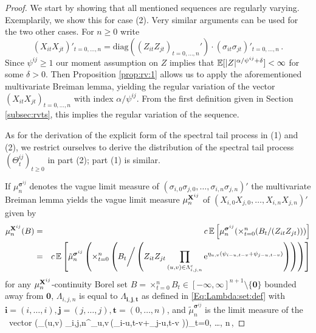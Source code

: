\ere
\begin{proof} 
We start by showing that all mentioned sequences 
are regularly varying. Exemplarily, we show this for case (2). 
Very similar arguments can be used for the two other cases.
For $n \geq 0$ write 
$$ \left(X_{it}X_{jt}\right)'_{t=0, \ldots, n}=\mbox{diag}\left((Z_{it}Z_{jt})_{t=0, \ldots, n}'\right)\cdot
\left(\sigma_{it}\sigma_{jt}\right)'_{t=0, \ldots, n}\,.$$
Since $\psi^{ij} \geq 1$ our moment assumption on $Z$ implies that 
${\mathbb E}[|Z|^{\alpha/\psi^{ij}+\delta}]<\infty$ for some $\delta>0$. Then  Proposition \ref{prop:rv:1} 
allows us to apply the aforementioned multivariate Breiman lemma, yielding  the  
regular variation of the vector $(X_{it}X_{jt})_{t=0, \ldots, n}$ with index $\alpha/\psi^{ij}$. From the first definition given in Section \ref{subsec:rvts}, this implies the regular variation of the sequence.
\par
As for the derivation of the explicit form of the spectral tail process in (1) and (2), we restrict ourselves to derive the distribution of the spectral tail process $(\Theta_t^{ij})_{t \geq 0}$ in part (2); part (1) is similar.
\par
If $\mu_n^{{\boldsymbol{\sigma}}^{ij}}$ denotes the vague limit measure of 
$(\sigma_{i,0}\sigma_{j,0}, \ldots, \sigma_{i,n}\sigma_{j,n})'$ the multivariate Breiman lemma yields 
the vague limit measure $\mu_n^{{\bf X}^{ij}}$ of $(X_{i,0}X_{j,0}, \ldots, X_{i,n}X_{j,n})'$ given by
\begin{eqnarray}\nonumber \mu_n^{{\bf X}^{ij}}(B)&=& c\,{\mathbb E}\left[\mu_n^{\boldsymbol{\sigma}^{ij}}(\times_{t=0}^n (B_t/(Z_{it}Z_{jt})))\right] \\
&=& \label{Eq:mu:X} c\,{\mathbb E}\left[\tilde{\mu}_n^{\boldsymbol{\sigma}^{ij}}\left(\times_{t=0}^n \left(B_t \bigg/ \left(Z_{it}Z_{jt}\prod_{(u,v) \in \Lambda_{i,j,n}^c}{\rm e}^{\eta_{u,v}(\psi_{i-u,t-v}+\psi_{j-u,t-v})}\right)\right)\right)\right] 
\end{eqnarray}
for any $\mu_n^{{\bf X}^{ij}}$-continuity  Borel set $B=\times_{t=0}^n B_t \in [-\infty,\infty]^{n+1} \setminus \{\mathbf{0}\}$ bounded away from $\mathbf{0}$, $\Lambda_{i,j,n}$ is equal to $\Lambda_{\mathbf{i}, \mathbf{j}, \mathbf{t}}$ 
as defined in \eqref{Eq:Lambda:set:def} with $\mathbf{i}=(i, \ldots, i), \mathbf{j}=(j, \ldots, j), \mathbf{t}=(0, \ldots ,n)$, and $\tilde{\mu}^{\boldsymbol{\sigma}^{ij}}_n$ 
is the limit measure of the \regvary\ vector
\beam \label{Eq:prod:sigma:tilde}
\Big(\prod_{(u,v) \in \Lambda_{i,j,n}}\ex^{\eta_{u,v}\,(\psi_{i-u,t-v}+\psi_{j-u,t-v} )}\Big)_{t=0, \ldots, n}\,,

\end{proof}
